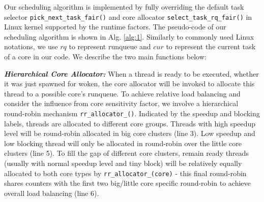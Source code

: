 \documentclass[10pt,conference]{IEEEtran}
\begin{document}
Our scheduling algorithm is implemented by fully overriding the default task selector \texttt{pick\_next\_task\_fair()} and core allocator \texttt{select\_task\_rq\_fair()} in Linux kernel supported by the runtime factors. The pseudo-code of our scheduling algorithm is shown in Alg. \ref{alg:1}. 
Similarly to commonly used Linux notations, we use $rq$ to represent runqueue and $cur$ to represent the current task of a core in our code. We describe the two main functions below:

\textbf{\textit{Hierarchical Core Allocator:}}
When a thread is ready to be executed, whether it was just spawned for woken, the core allocator will be invoked to allocate this thread to a possible core's runqueue. To achieve relative load balancing and consider the influence from core sensitivity factor, we involve a hierarchical round-robin mechanism \texttt{rr\_allocator\_()}. Indicated by the speedup and blocking labels, threads are allocated to different core groups. Threads with high speedup level will be round-robin allocated in big core clusters (line 3). Low speedup and low blocking thread will only be allocated in round-robin over the little core clusters (line 5). 
To fill the gap of different core clusters, remain ready threads (usually with normal speedup level and tiny block) will be relatively equally allocated to both core types by \texttt{rr\_allocator\_(core)} - this final round-robin shares counters with the first two big/little core specific round-robin to achieve overall load balancing (line 6).  
\end{document}
